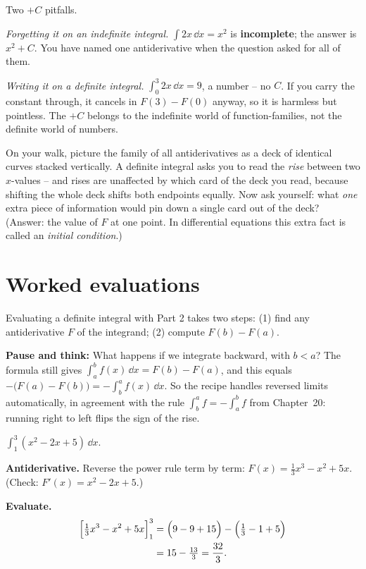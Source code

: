 \begin{trapbox}
Two $+C$ pitfalls.

\emph{Forgetting it on an indefinite integral.} $\int 2x\,\dd x = x^2$ is
\textbf{incomplete}; the answer is $x^2+C$. You have named one antiderivative when
the question asked for all of them.

\emph{Writing it on a definite integral.} $\int_0^3 2x\,\dd x = 9$, a number --
no $C$. If you carry the constant through, it cancels in $F(3)-F(0)$ anyway, so
it is harmless but pointless. The $+C$ belongs to the indefinite world of
function-families, not the definite world of numbers.
\end{trapbox}

\begin{walkbox}
On your walk, picture the family of all antiderivatives as a deck of identical
curves stacked vertically. A definite integral asks you to read the \emph{rise}
between two $x$-values -- and rises are unaffected by which card of the deck you
read, because shifting the whole deck shifts both endpoints equally. Now ask
yourself: what \emph{one} extra piece of information would pin down a single card
out of the deck? (Answer: the value of $F$ at one point. In differential
equations this extra fact is called an \emph{initial condition}.)
\end{walkbox}

\section{Worked evaluations}

Evaluating a definite integral with Part 2 takes two steps: (1) find any
antiderivative $F$ of the integrand; (2) compute $F(b)-F(a)$.

\begin{recoverybox}
\textbf{Pause and think:} What happens if we integrate backward, with $b < a$?
The formula still gives $\int_a^b f(x)\,\dd x = F(b)-F(a)$, and this equals
$-\bigl(F(a)-F(b)\bigr) = -\int_b^a f(x)\,\dd x$. So the recipe handles reversed
limits automatically, in agreement with the rule $\int_b^a f = -\int_a^b f$ from
Chapter~20: running right to left flips the sign of the rise.
\end{recoverybox}

\begin{example}\label{ch21:ex-poly}
$\displaystyle \int_1^3 (x^2 - 2x + 5)\,\dd x.$

\textbf{Antiderivative.} Reverse the power rule term by term:
$F(x)=\tfrac13 x^3 - x^2 + 5x$. (Check: $F'(x)=x^2-2x+5$.)

\textbf{Evaluate.}
\begin{align*}
  \Big[\tfrac13 x^3 - x^2 + 5x\Big]_{1}^{3}
  &= \Big(9 - 9 + 15\Big) - \Big(\tfrac13 - 1 + 5\Big)\\
  &= 15 - \tfrac{13}{3} = \frac{32}{3}.
\end{align*}
\end{example}


